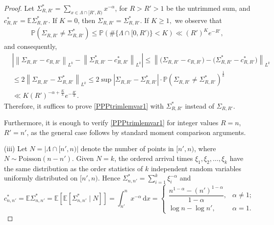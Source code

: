 \documentclass[11pt,twoside,a4paper,reqno]{amsart}
\renewcommand{\d}{\, \text{d}}
\renewcommand{\P}{\mathbb{P}}
\newcommand{\E}{\mathbb{E}}
\begin{document}
\begin{proof}
Let $\Sigma^*_{R,R'} = \sum_{x\in \Lambda \cap [R',R)} x^{-\alpha}$, for $R>R'>1$ be the untrimmed sum, and $c^*_{R,R'}=\E \Sigma^*_{R,R'}$. If $K=0$, then $\Sigma_{R,R'}=\Sigma^*_{R,R'}.$ If $K\ge1,$ we observe that
\begin{align*}
\P\left(\Sigma_{R,R'} \not = \Sigma^*_{R,R'}\right) \leq \P\left( \#\{\Lambda\cap [0,R')\} <K\right) \ll (R')^K e^{-R'},
\end{align*}
and consequently,
\begin{align*}
&\left|\left\|\Sigma_{R,R'}-c_{R,R'}\right\|_{L^k}-\left\|\Sigma^*_{R,R'}-c^*_{R,R'}\right\|_{L^k}
\right|\le\left\|\bigl(\Sigma_{R,R'}-c_{R,R'}\bigr)-\bigl(\Sigma^*_{R,R'}-c^*_{R,R'}\bigr)
\right\|_{L^k}\\
&\le 2\left\|\Sigma_{R,R'}-\Sigma^*_{R,R'}\right\|_{L^k}\leq 2\sup |\Sigma_{R,R'}-\Sigma^*_{R,R'}|\cdot \P\left(\Sigma_{R,R'} \not=\Sigma^*_{R,R'}\right)^{\frac{1}{k}}\\
&\ll K(R')^{-\alpha+\frac{K}{k}}e^{-\frac{R'}{k}}.
\end{align*}
Therefore, it suffices to prove \eqref{PPPtrimlemvar1} with $\Sigma^*_{R,R'}$ instead of $\Sigma_{R,R'}$.


Furthermore, it is enough to verify \eqref{PPPtrimlemvar1} for integer values $R=n$, $R'=n'$, as the general case follows by standard moment comparison arguments.



(iii)
Let $N= |\Lambda \cap [n',n)|$ denote the number of points in $[n',n)$, where $N\sim \text{Poisson}(n-n')$. Given $N=k$, the ordered arrival times $\xi_1, \xi_2, \dots, \xi_k$ have the same distribution as the order statistics of $k$ independent random variables uniformly distributed on $[n',n)$. Hence $\Sigma_{n,n'}^*=\sum_{i=1}^k \xi_i^{-\alpha}$ and
\begin{equation*}
c^*_{n,n'}=\E \Sigma^*_{n,n'}=\E \left[\E \left[\Sigma^*_{n,n'}\mid N\right]\right]=\int_{n'}^{n} x^{-\alpha} \d x=
\begin{cases}
\dfrac{n^{1-\alpha} - (n')^{1-\alpha}}{1 - \alpha}, & \alpha \neq 1;\\
\log n-\log n', & \alpha = 1.
\end{cases}
\end{equation*}



\end{proof}
\end{document}
